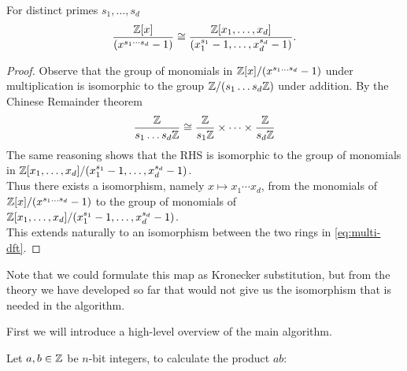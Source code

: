 \begin{lemma}\label{eq:uni-to-multi}
    For distinct primes $s_1, \ldots, s_d$
    \begin{equation}\label{eq:multi-dft}
        \frac{{\mathbb Z}[x]}{(x^{s_1\cdots s_d} - 1)} \cong \frac{{\mathbb Z}[x_1, \ldots, x_d]}{(x_1^{s_1} - 1, \ldots, x_d^{s_d} - 1)}.
    \end{equation}
\end{lemma}

\begin{proof}
    Observe that the group of monomials in ${\mathbb Z}[x]/(x^{s_1\ldots s_d} - 1)$ under multiplication is isomorphic to the group ${\mathbb Z}/(s_1 \ldots s_d{\mathbb Z})$ under addition. By the Chinese Remainder theorem
    \[
        \frac{{\mathbb Z}}{s_1\ldots s_d {\mathbb Z}} \cong \frac{{\mathbb Z}}{s_1 {\mathbb Z}} \times \cdots \times \frac{{\mathbb Z}}{s_d {\mathbb Z}}
    \]
    The same reasoning shows that the RHS is isomorphic to the group of monomials in ${\mathbb Z}[x_1, \ldots, x_d]/(x_1^{s_1} - 1, \ldots, x_d^{s_d} - 1)$.\\
    Thus there exists a isomorphism, namely $x \mapsto x_1\cdots x_d$, from the monomials of ${\mathbb Z}[x]/(x^{s_1\ldots s_d} - 1)$ to the group of monomials of ${\mathbb Z}[x_1, \ldots, x_d]/(x_1^{s_1} - 1, \ldots, x_d^{s_d} - 1)$.\\
    This extends naturally to an isomorphism between the two rings in \eqref{eq:multi-dft}.
\end{proof}

Note that we could formulate this map as Kronecker substitution, but from the theory we have developed so far that would not give us the isomorphism that is needed in the algorithm.

First we will introduce a high-level overview of the main algorithm.

Let $a, b \in {\mathbb Z}$ be $n$-bit integers, to calculate the product $ab$:

